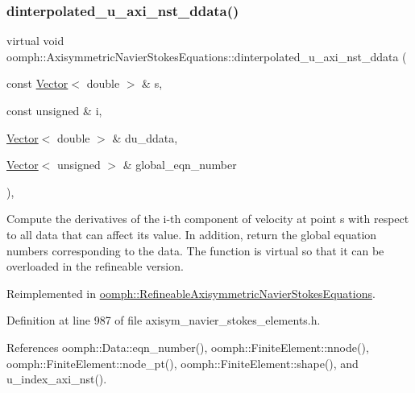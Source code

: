 \subsubsection{\texorpdfstring{dinterpolated\+\_\+u\+\_\+axi\+\_\+nst\+\_\+ddata()}{dinterpolated\_u\_axi\_nst\_ddata()}}
{\footnotesize\ttfamily virtual void oomph\+::\+Axisymmetric\+Navier\+Stokes\+Equations\+::dinterpolated\+\_\+u\+\_\+axi\+\_\+nst\+\_\+ddata (\begin{DoxyParamCaption}\item[{const \hyperlink{classoomph_1_1Vector}{Vector}$<$ double $>$ \&}]{s,  }\item[{const unsigned \&}]{i,  }\item[{\hyperlink{classoomph_1_1Vector}{Vector}$<$ double $>$ \&}]{du\+\_\+ddata,  }\item[{\hyperlink{classoomph_1_1Vector}{Vector}$<$ unsigned $>$ \&}]{global\+\_\+eqn\+\_\+number }\end{DoxyParamCaption})\hspace{0.3cm}{\ttfamily [inline]}, {\ttfamily [virtual]}}



Compute the derivatives of the i-\/th component of velocity at point s with respect to all data that can affect its value. In addition, return the global equation numbers corresponding to the data. The function is virtual so that it can be overloaded in the refineable version. 



Reimplemented in \hyperlink{classoomph_1_1RefineableAxisymmetricNavierStokesEquations_ac1a49ddb1942c4ee2d5cacb94b1c9251}{oomph\+::\+Refineable\+Axisymmetric\+Navier\+Stokes\+Equations}.



Definition at line 987 of file axisym\+\_\+navier\+\_\+stokes\+\_\+elements.\+h.



References oomph\+::\+Data\+::eqn\+\_\+number(), oomph\+::\+Finite\+Element\+::nnode(), oomph\+::\+Finite\+Element\+::node\+\_\+pt(), oomph\+::\+Finite\+Element\+::shape(), and u\+\_\+index\+\_\+axi\+\_\+nst().

\mbox{\label{classoomph_1_1AxisymmetricNavierStokesEquations_a737e9a0e65aa0e88a63d740ea56717ec}} 
